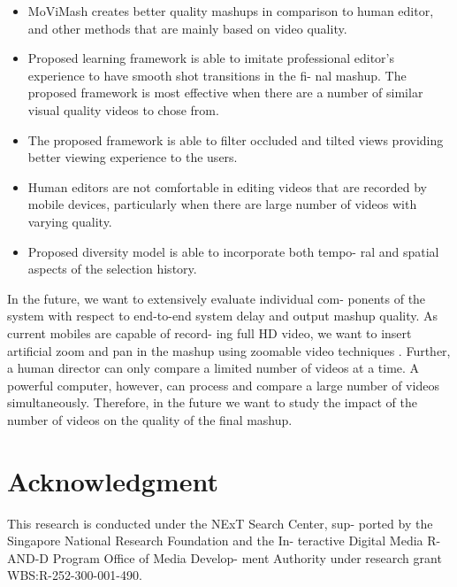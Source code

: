 \documentclass{sig-alternate}
\providecommand{\DIFadd}[1]{{\protect\color{blue}\uwave{#1}}} %
\providecommand{\DIFaddbegin}{} %
\providecommand{\DIFaddend}{} %
\begin{document}
 \begin{itemize} 
\item MoViMash creates better quality mashups in comparison to
human editor, and other methods that are mainly based on
video quality.
\item Proposed learning framework is able to imitate professional
editor’s experience to have smooth shot transitions in the fi-
nal mashup. The proposed framework is most effective when
there are a number of similar visual quality videos to chose
from.
\item The proposed framework is able to filter occluded and tilted
views providing better viewing experience to the users.
\item Human editors are not comfortable in editing videos that are
recorded by mobile devices, particularly when there are large
number of videos with varying quality.
\item Proposed diversity model is able to incorporate both tempo-
ral and spatial aspects of the selection history.
 \end{itemize} 
In the future, we want to extensively evaluate individual com-
ponents of the system with respect to end-to-end system delay and
output mashup quality. As current mobiles are capable of record-
ing full HD video, we want to insert artificial zoom and pan in the
mashup using zoomable video techniques \cite{salas:eleven}. Further, a human
director can only compare a limited number of videos at a time.
A powerful computer, however, can process and compare a large
number of videos simultaneously. Therefore, in the future we want
to study the impact of the number of videos on the quality of the
final mashup.

\section*{Acknowledgment}
\DIFaddbegin \DIFadd{I am a new sentence.
}\DIFaddend This research is conducted under the NExT Search Center, sup-
ported by the Singapore National Research Foundation and the In-
teractive Digital Media R-AND-D Program Office of Media Develop-
ment Authority under research grant WBS:R-252-300-001-490.




%

\end{document}
